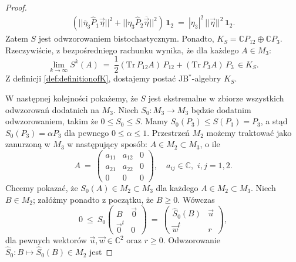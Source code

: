 {\begin{proof}
\begin{multline}
\left( || \overline{\eta}_{3} \hat{P}_{1} \vec{\eta} ||^{2} +
    || \eta_{3} \hat{P}_{2} \overline{\vec{\eta}} ||^{2} \right) \, \mathbf{1}_{2}
    \: = \:
|\eta_{3}|^{2} \, ||\vec{\eta}||^{2} \, \mathbf{1}_{2}.
\end{multline}
Zatem $S$ jest odwzorowaniem bistochastycznym.
Ponadto,
$K_{S}= \mathbb{C} P_{12} \oplus \mathbb{C} P_{3}$.
Rzeczywiście,
z bezpośredniego rachunku wynika, że dla każdego $A \in M_{3}$:
\begin{equation}
\lim \limits_{k \rightarrow \infty} S^{k}(A) \:=\:
\frac{1}{2} (\text{Tr} \, P_{12} A )\, P_{12} +
    (\text{Tr} \, P_{3} A)\, P_{3} \, \in K_{S}.
\end{equation}
Z definicji \eqref{def:definitionofK},
dostajemy postać JB$^{*}$-algebry $K_{S}$.

W następnej kolejności pokażemy, że $S$ jest ekstremalne
w zbiorze wszystkich odwzorowań dodatnich na $M_{3}$.
Niech $S_{0}: M_{3} \rightarrow M_{3}$ będzie dodatnim odwzorowaniem,
takim że
$0 \leq S_{0} \leq S$.
Mamy $S_{0}(P_{3}) \leq S(P_{3}) = P_{3}$,
a stąd $S_{0}(P_{3}) = \alpha P_{3}$ dla pewnego $0 \leq \alpha \leq 1$.
Przestrzeń $M_{2}$ możemy traktować jako zanurzoną w $M_{3}$
w następujący sposób:
$A \in M_{2} \! \subset \! M_{3}$, o ile
\begin{equation}
\label{RandomLabel:450031}
    A \: = \: \left( \begin{array}{ccc}
    a_{11} & a_{12} & 0 \\
    a_{21} & a_{22} & 0 \\
    0 & 0 & 0
    \end{array} \right), \quad
    a_{ij} \in \mathbb{C}, \,\, i,j = 1,2.
\end{equation}
Chcemy pokazać, że $S_{0}(A) \in M_{2} \! \subset \! M_{3}$
dla każdego $A \in M_{2} \! \subset \! M_{3}$.
Niech $B \in M_{2}$; załóżmy ponadto z początku, że $B \geq 0$.
Wówczas
\begin{equation}
\label{eq:SMapsM2intoM2}
 0 \:\leq\: S_{0} \begin{pmatrix}
               B & \vec{0} \\ \vec{0}^{t} & 0
              \end{pmatrix} \: = \:
 \begin{pmatrix}
  \hat{S}_{0}(B) & \vec{u} \\ \vec{w}^{t} & r
 \end{pmatrix},
\end{equation}
dla pewnych wektorów $\vec{u}, \vec{w} \in \mathbb{C}^{2}$ oraz $r \geq 0$.
Odwzorowanie $\hat{S}_{0}:B \mapsto \hat{S}_{0}(B) \in M_{2}$ jest

\end{proof}}
